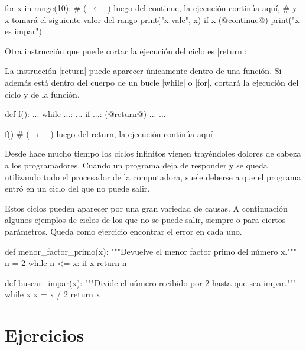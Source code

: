 \begin{codigo-python-sn}
for x in range(10): # (~$\leftarrow$~) luego del continue, la ejecución continúa aquí,
                    # y x tomará el siguiente valor del rango
    print("x vale", x)
    if x %
        (@continue@)
    print("x es impar")
\end{codigo-python-sn}

Otra instrucción que puede cortar la ejecución del ciclo es |return|:

\begin{observacion}
La instrucción |return| puede aparecer únicamente dentro de una función. Si
además está dentro del cuerpo de un bucle |while| o |for|, cortará la ejecución
del ciclo y de la función.

\begin{codigo-python-sn}
def f():
    ...
    while ...:
        ...
        if ...:
            (@return@)
        ...
    ...

f()
# (~$\leftarrow$~) luego del return, la ejecución continúa aquí
\end{codigo-python-sn}
\end{observacion}

\begin{sabias_que}
Desde hace mucho tiempo los ciclos infinitos vienen trayéndoles dolores de
cabeza a los programadores.  Cuando un programa deja de responder y se
queda utilizando todo el procesador de la computadora, suele deberse a que
el programa entró en un ciclo del que no puede salir.

Estos ciclos pueden aparecer por una gran variedad de causas.  A
continuación algunos ejemplos de ciclos de los que no se puede salir,
siempre o para ciertos parámetros.  Queda como ejercicio encontrar el error
en cada uno.

\begin{codigo-python-sn}
def menor_factor_primo(x):
    """Devuelve el menor factor primo del número x."""
    n = 2
    while n <= x:
        if x %
            return n
\end{codigo-python-sn}

\begin{codigo-python-sn}
def buscar_impar(x):
    """Divide el número recibido por 2 hasta que sea impar."""
    while x %
        x = x / 2
    return x
\end{codigo-python-sn}
\end{sabias_que}

\section{Ejercicios}

